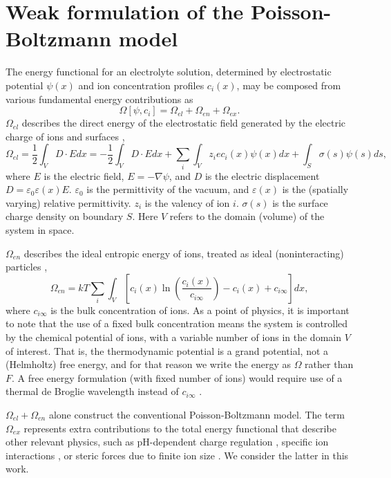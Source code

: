 \section{Weak formulation of the Poisson-Boltzmann model}

The energy functional for an electrolyte solution, determined by
electrostatic potential $\psi(x)$ and ion concentration profiles
$c_i(x)$, may be composed from various fundamental energy
contributions as
\begin{equation}
    \Omega[\psi, c_i] = \Omega_{el} + \Omega_{en} +  \Omega_{ex}.
\end{equation}
$\Omega_{el}$ describes the direct energy of the electrostatic field generated by the electric charge of ions and surfaces \citep{Jackson_Classical_Electrodynamics},
\begin{equation}
  \Omega_{el}  =\frac{1}{2} \int_{V}D \cdot E dx
  = -\frac{1}{2} \int_{V}D \cdot E dx + \sum_i \int_V z_i e c_i(x) \psi(x) dx
  + \int_{S} \sigma(s) \psi(s) ds,
\end{equation}
where $E$ is the electric field, $E=-\nabla\psi$, and $D$ is the
electric displacement $D=\varepsilon_0
\varepsilon(x)E$. $\varepsilon_0$ is the permittivity of the vacuum,
and $\varepsilon(x)$ is the (spatially varying) relative
permittivity. $z_i$ is the valency of ion $i$.  $\sigma(s)$ is the
surface charge density on boundary $S$. Here $V$ refers to the domain
(volume) of the system in space.

$\Omega_{en}$ describes the ideal entropic energy of ions, treated as ideal (noninteracting) particles \citep{GrayStiles2018,DagmawiParsons2024},
\begin{equation}
    \Omega_{en} = kT \sum_{i} \int_{V} \left[ c_i(x) \ln \left(\frac{c_i(x)}{c_{i\infty}} \right) - c_{i}(x) + c_{i\infty} \right] dx,
\end{equation}
where $c_{i\infty}$ is the bulk concentration of ions. As a point of
physics, it is important to note that the use of a fixed bulk
concentration means the system is controlled by the chemical potential
of ions, with a variable number of ions in the domain $V$ of interest.
That is, the thermodynamic potential is a grand potential, not a
(Helmholtz) free energy, and for that reason we write the energy as $\Omega$ rather
than $F$. A free energy formulation (with fixed number of ions) would
require use of a thermal de Broglie wavelength instead of
$c_{i\infty}$ \citep{GrayStiles2018}.


$\Omega_{el} + \Omega_{en}$ alone construct the conventional
Poisson-Boltzmann model. The term $\Omega_{ex}$ represents extra
contributions to the total energy functional that describe other
relevant physics, such as pH-dependent charge regulation
\citep{ParsonsSalis2019}, specific ion interactions
\citep{ParsonsCarucciSalis2022}, or steric forces due to finite ion
size \citep{LopezGarciaHornoGrosse2018}. We consider the latter in this
work.


